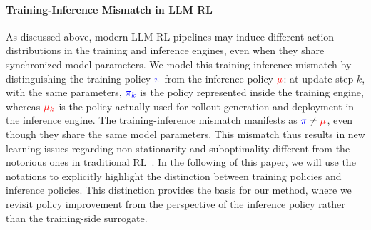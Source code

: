 \paragraph{Training-Inference Mismatch in LLM RL}
As discussed above, modern LLM RL pipelines may induce different action distributions in the training and inference engines, even when they share synchronized model parameters.
We model this training-inference mismatch by distinguishing the training policy $\textcolor{blue}{\pi}$ from the inference policy $\textcolor{red}{\mu}$: at update step $k$, with the same parameters, $\textcolor{blue}{\pi_k}$ is the policy represented inside the training engine, whereas $\textcolor{red}{\mu_k}$ is the policy actually used for rollout generation and deployment in the inference engine. 
The training-inference mismatch manifests as $\textcolor{blue}{\pi}\neq\textcolor{red}{\mu}$, even though they share the same model parameters.
This mismatch thus results in new learning issues regarding non-stationarity and suboptimality different from the notorious ones in traditional RL~\citep{Hasselt18DRLDeadly,TangB24CHAIN,Wu2026SWD}.
In the following of this paper, we will use the notations to explicitly highlight the distinction between training policies and inference policies.
This distinction provides the basis for our method, where we revisit policy improvement from the perspective of the inference policy rather than the training-side surrogate.

